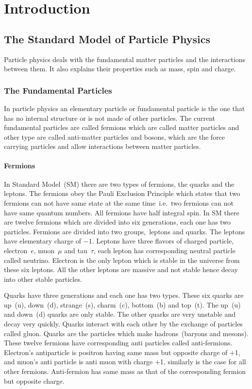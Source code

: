 
\chapter{Introduction}
\section{The Standard Model of Particle Physics}
Particle physics deals with the fundamental matter particles and the interactions between them. It also explains their properties such as mass, spin and charge. 
\subsection{The Fundamental Particles}
In particle physics an elementary particle or fundamental particle is the one that has no internal structure or is not made of other particles. The current fundamental particles are called fermions which are called matter particles and other type are called anti-matter particles and bosons, which are the force carrying particles and allow interactions between matter particles.
\subsubsection{Fermions}
In Standard Model~(SM) there are two types of fermions, the quarks and the leptons. The fermions obey the Pauli Exclusion Principle which states that two fermions can not have same state at the same time~i.e.~two fermions can not have same quantum numbers. All fermions have half integral spin. In SM there are twelve fermions which are divided into six generations, each one  has two particles. Fermions are divided into two groups,~leptons and quarks. The leptons have elementary charge of $-1$. Leptons have three flavors of charged particle, electron~$e$, muon~$\mu$ and tau~$\tau$, each lepton has corresponding neutral particle called neutrino. Electron is the only lepton which is stable in the universe from these six leptons. All the other leptons are massive and not stable hence decay into other stable particles.

Quarks have three generations and each one has two types. These six quarks are up~(u), down~(d), strange~(s), charm~(c), bottom~(b) and top~(t). The up~(u) and down~(d) quarks are only stable. The other quarks are very unstable and decay very quickly. Quarks interact with each other by the exchange of particles called gluon. Quarks are the particles which make hadrons~(baryons and mesons).
These twelve fermions have corresponding anti particles called anti-fermions. Electron's antiparticle is positron having same mass but opposite charge of +1, and muon's anti particle is anti muon with charge +1, similarly is the case for all other fermions. Anti-fermion has same mass as that of the corresponding fermion but opposite charge. 

